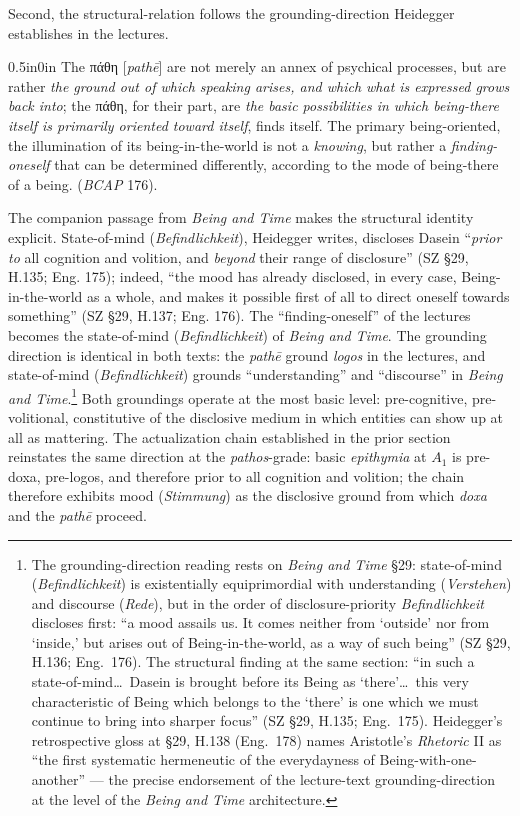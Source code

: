 \documentclass{article}
\newcommand{\gk}[1]{{\greekfont #1}}
\begin{document}
Second, the structural-relation follows the grounding-direction Heidegger establishes in the lectures.
\begin{adjustwidth}{0.5in}{0in}
    The \gk{πάθη} [\textit{pathē}] are not merely an annex of psychical processes, but are rather \textit{the ground out of which speaking arises, and which what is expressed grows back into}; the \gk{πάθη}, for their part, are \textit{the basic possibilities in which being-there itself is primarily oriented toward itself}, finds itself. The primary being-oriented, the illumination of its being-in-the-world is not a \textit{knowing}, but rather a \textit{finding-oneself} that can be determined differently, according to the mode of being-there of a being. (\textit{BCAP} 176).
\end{adjustwidth}
 The companion passage from \textit{Being and Time} makes the structural identity explicit. State-of-mind (\textit{Befindlichkeit}), Heidegger writes, discloses Dasein ``\textit{prior to} all cognition and volition, and \textit{beyond} their range of disclosure'' (SZ \S29, H.135; Eng. 175); indeed, ``the mood has already disclosed, in every case, Being-in-the-world as a whole, and makes it possible first of all to direct oneself towards something'' (SZ \S29, H.137; Eng. 176). The ``finding-oneself'' of the lectures becomes the state-of-mind (\textit{Befindlichkeit}) of \textit{Being and Time}. The grounding direction is identical in both texts: the \textit{pathē} ground \textit{logos} in the lectures, and state-of-mind (\textit{Befindlichkeit}) grounds ``understanding'' and ``discourse'' in \textit{Being and Time}.\footnote{The grounding-direction reading rests on \textit{Being and Time} \S 29: state-of-mind (\textit{Befindlichkeit}) is existentially equiprimordial with understanding (\textit{Verstehen}) and discourse (\textit{Rede}), but in the order of disclosure-priority \textit{Befindlichkeit} discloses first: ``a mood assails us. It comes neither from `outside' nor from `inside,' but arises out of Being-in-the-world, as a way of such being'' (SZ \S 29, H.136; Eng.~176). The structural finding at the same section: ``in such a state-of-mind\ldots\ Dasein is brought before its Being as `there'\ldots\ this very characteristic of Being which belongs to the `there' is one which we must continue to bring into sharper focus'' (SZ \S 29, H.135; Eng.~175). Heidegger's retrospective gloss at \S 29, H.138 (Eng.~178) names Aristotle's \textit{Rhetoric} II as ``the first systematic hermeneutic of the everydayness of Being-with-one-another'' --- the precise endorsement of the lecture-text grounding-direction at the level of the \textit{Being and Time} architecture.} Both groundings operate at the most basic level: pre-cognitive, pre-volitional, constitutive of the disclosive medium in which entities can show up at all as mattering. The actualization chain established in the prior section reinstates the same direction at the \textit{pathos}-grade: basic \textit{epithymia} at $A_1$ is pre-doxa, pre-logos, and therefore prior to all cognition and volition; the chain therefore exhibits mood (\textit{Stimmung}) as the disclosive ground from which \textit{doxa} and the \textit{pathē} proceed.
\end{document}
